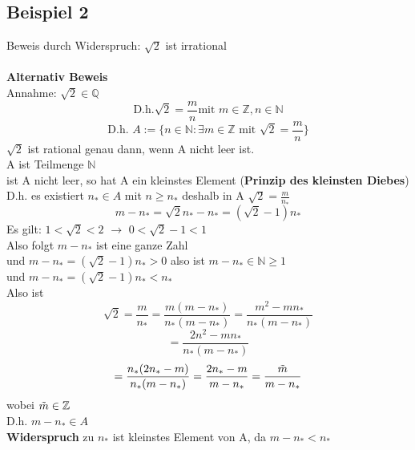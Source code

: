 \documentclass{article}
\begin{document}
        \subsection{Beispiel 2}
        Beweis durch Widerspruch: $\sqrt{2}$ ist irrational\\\\
        \textbf{Alternativ Beweis}\\
            Annahme: $\sqrt{2}\in \mathbb{Q}$\\
            $$\text{D.h.} \sqrt{2}=\frac{m}{n} \text{mit }m \in \mathbb{Z}, n\in \mathbb{N}$$
            $$\text{D.h. } A:= \{ n\in \mathbb{N} : \exists m \in \mathbb{Z} \text{ mit } \sqrt{2}=\frac{m}{n}\}$$
            $\sqrt{2}$ ist rational genau dann, wenn A  nicht leer ist.\\
            A ist Teilmenge $\mathbb{N}$\\
            ist A nicht leer, so hat A ein kleinstes Element (\textbf{Prinzip des kleinsten Diebes})\\
            D.h. es existiert $n_*\in A$ mit $n \ge n_*$ deshalb in A $\sqrt{2}=\frac{m}{n_*}$\\
            $$m-n_*=\sqrt{2}n_*-n_*=(\sqrt{2}-1)n_*$$
            Es gilt: $1<\sqrt{2}<2$ $\to$ $0<\sqrt{2}-1< 1$\\
            Also folgt $m-n_*$ ist eine ganze Zahl\\
            und $m-n_*=(\sqrt{2}-1)n_*>0$ also ist $m-n_* \in \mathbb{N} \ge 1$\\
            und $m-n_*=(\sqrt{2}-1)n_*< n_*$\\
            Also ist
            $$\sqrt{2}=\frac{m}{n_*} =
            \frac{m(m-n_*)}{n_*(m-n_*)}=
            \frac{m^2-mn_*}{n_*(m-n_*)}$$
            $$=\frac{2n^2-mn_*}{n_*(m-n_*)}$$
            $$=\frac{n_*(2n_*-m)}{n_*(m-n_*)}=
            \frac{2n_*-m}{m-n_*}=
            \frac{\Tilde{m}}{m-n_*}$$
            wobei $\Tilde{m} \in \mathbb{Z}$\\
            D.h. $m-n_* \in A$\\
            \textbf{Widerspruch} zu $n_*$ ist kleinstes Element von A, da $m-n_*<n_*$
\end{document}
